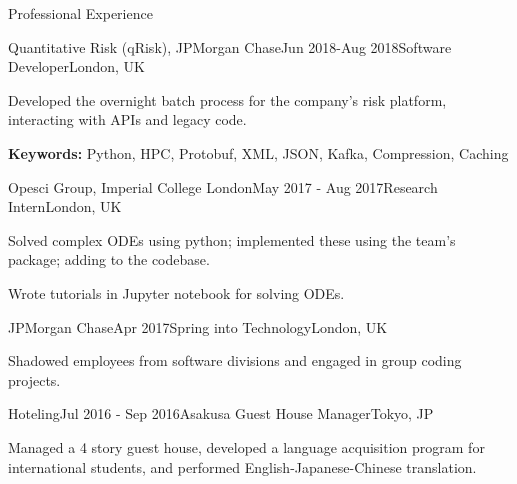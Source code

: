 \documentclass[10pt]{resume} %
\begin{document}
\begin{rSection}{Professional Experience}


\begin{rSubsection}{Quantitative Risk (qRisk), JPMorgan Chase}{Jun 2018-Aug 2018}{Software
Developer}{London, UK}
  \item Developed the overnight batch process for the company's risk platform,
  interacting with APIs and legacy code.
  \item \textbf{Keywords:} Python, HPC, Protobuf, XML, JSON, Kafka, Compression,
  Caching
\end{rSubsection}


\begin{rSubsection}{Opesci Group, Imperial College London}{May 2017 - Aug 2017}{Research Intern}{London, UK}
    \item Solved complex ODEs using python; implemented these using the
    team's package; adding to the codebase.
    \item Wrote tutorials in Jupyter notebook for solving ODEs.
\end{rSubsection}


\begin{rSubsection}{JPMorgan Chase}{Apr 2017}{Spring into Technology}{London, UK}
    \item Shadowed employees from software divisions and engaged in group
    coding projects.
\end{rSubsection}

%
%

\begin{rSubsection}{Hoteling}{Jul 2016 - Sep 2016}{Asakusa Guest House Manager}{Tokyo, JP}
    \item Managed a 4 story guest house, developed a language acquisition
    program for international students, and performed English-Japanese-Chinese
    translation.
\end{rSubsection}


\end{rSection}
\end{document}
